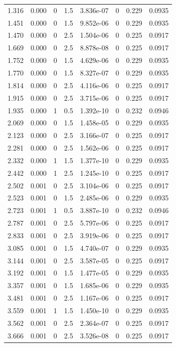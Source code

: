 \documentclass[preview]{standalone}
\begin{document}
{{\begin{tabular}{L{1.2cm}C{1.2cm} C{0.3cm}C{0.5cm} C{1.4cm}C{1.4cm} C{1.4cm}C{1.4cm}}
  1.316  &  0.000  & 0     & 1.5 &  3.836e-07  & 0  & 0.229 &  0.0935   \\ 
  1.451  &  0.000  & 0     & 1.5 &  9.852e-06  & 0  & 0.229 &  0.0935   \\ 
  1.470  &  0.000  & 0     & 2.5 &  1.504e-06  & 0  & 0.225 &  0.0917   \\ 
  1.669  &  0.000  & 0     & 2.5 &  8.878e-08  & 0  & 0.225 &  0.0917   \\ 
  1.752  &  0.000  & 0     & 1.5 &  4.629e-06  & 0  & 0.229 &  0.0935   \\ 
  1.770  &  0.000  & 0     & 1.5 &  8.327e-07  & 0  & 0.229 &  0.0935   \\ 
  1.814  &  0.000  & 0     & 2.5 &  4.116e-06  & 0  & 0.225 &  0.0917   \\ 
  1.915  &  0.000  & 0     & 2.5 &  3.715e-06  & 0  & 0.225 &  0.0917   \\ 
  1.935  &  0.000  & 1     & 0.5 &  1.392e-10  & 0  & 0.232 &  0.0946   \\ 
  2.069  &  0.000  & 0     & 1.5 &  1.458e-05  & 0  & 0.229 &  0.0935   \\ 
  2.123  &  0.000  & 0     & 2.5 &  3.166e-07  & 0  & 0.225 &  0.0917   \\ 
  2.281  &  0.000  & 0     & 2.5 &  1.562e-06  & 0  & 0.225 &  0.0917   \\ 
  2.332  &  0.000  & 1     & 1.5 &  1.377e-10  & 0  & 0.229 &  0.0935   \\ 
  2.442  &  0.000  & 1     & 2.5 &  1.245e-10  & 0  & 0.225 &  0.0917   \\ 
  2.502  &  0.001  & 0     & 2.5 &  3.104e-06  & 0  & 0.225 &  0.0917   \\ 
  2.523  &  0.001  & 0     & 1.5 &  2.485e-06  & 0  & 0.229 &  0.0935   \\ 
  2.723  &  0.001  & 1     & 0.5 &  3.887e-10  & 0  & 0.232 &  0.0946   \\ 
  2.787  &  0.001  & 0     & 2.5 &  5.797e-06  & 0  & 0.225 &  0.0917   \\ 
  2.833  &  0.001  & 0     & 2.5 &  3.919e-06  & 0  & 0.225 &  0.0917   \\ 
  3.085  &  0.001  & 0     & 1.5 &  4.740e-07  & 0  & 0.229 &  0.0935   \\ 
  3.144  &  0.001  & 0     & 2.5 &  3.587e-05  & 0  & 0.225 &  0.0917   \\ 
  3.192  &  0.001  & 0     & 1.5 &  1.477e-05  & 0  & 0.229 &  0.0935   \\ 
  3.357  &  0.001  & 0     & 1.5 &  1.685e-06  & 0  & 0.229 &  0.0935   \\ 
  3.481  &  0.001  & 0     & 2.5 &  1.167e-06  & 0  & 0.225 &  0.0917   \\ 
  3.559  &  0.001  & 1     & 1.5 &  1.450e-10  & 0  & 0.229 &  0.0935   \\ 
  3.562  &  0.001  & 0     & 2.5 &  2.364e-07  & 0  & 0.225 &  0.0917   \\ 
  3.666  &  0.001  & 0     & 2.5 &  3.526e-08  & 0  & 0.225 &  0.0917   \\ 
\hline 
\end{tabular} 

}}
\end{document}
